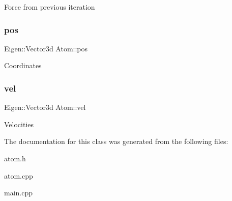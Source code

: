 Force from previous iteration \mbox{\label{class_atom_a9c44a53717ca3857065c0a36787359e1}} 
\subsubsection{\texorpdfstring{pos}{pos}}
{\footnotesize\ttfamily Eigen\+::\+Vector3d Atom\+::pos}

Coordinates \mbox{\label{class_atom_aabc1e87e4ed861ae02f781d3f43d8481}} 
\subsubsection{\texorpdfstring{vel}{vel}}
{\footnotesize\ttfamily Eigen\+::\+Vector3d Atom\+::vel}

Velocities 

The documentation for this class was generated from the following files\+:\begin{DoxyCompactItemize}
\item 
atom.\+h\item 
atom.\+cpp\item 
main.\+cpp\end{DoxyCompactItemize}
